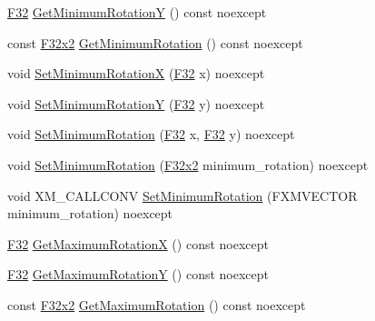\begin{DoxyCompactItemize}
\item 
\mbox{\hyperlink{namespacemage_aa97e833b45f06d60a0a9c4fc22ae02c0}{F32}} \mbox{\hyperlink{classmage_1_1script_1_1_mouse_look_script_a8faf82867207fb604f7155b8dbadfdb0}{Get\+Minimum\+RotationY}} () const noexcept
\item 
const \mbox{\hyperlink{namespacemage_aee4759dedc8def6c6dec26b5c7eddf29}{F32x2}} \mbox{\hyperlink{classmage_1_1script_1_1_mouse_look_script_a09e7e193cf2f5dca3342a130268a7a67}{Get\+Minimum\+Rotation}} () const noexcept
\item 
void \mbox{\hyperlink{classmage_1_1script_1_1_mouse_look_script_a07c261e34b3131114efacb0d0f6ae076}{Set\+Minimum\+RotationX}} (\mbox{\hyperlink{namespacemage_aa97e833b45f06d60a0a9c4fc22ae02c0}{F32}} x) noexcept
\item 
void \mbox{\hyperlink{classmage_1_1script_1_1_mouse_look_script_ab78678ccb7bdf6ac4093b7911bf81d54}{Set\+Minimum\+RotationY}} (\mbox{\hyperlink{namespacemage_aa97e833b45f06d60a0a9c4fc22ae02c0}{F32}} y) noexcept
\item 
void \mbox{\hyperlink{classmage_1_1script_1_1_mouse_look_script_a6964af9c1c264be02c37671019ab117f}{Set\+Minimum\+Rotation}} (\mbox{\hyperlink{namespacemage_aa97e833b45f06d60a0a9c4fc22ae02c0}{F32}} x, \mbox{\hyperlink{namespacemage_aa97e833b45f06d60a0a9c4fc22ae02c0}{F32}} y) noexcept
\item 
void \mbox{\hyperlink{classmage_1_1script_1_1_mouse_look_script_ab901aa0a3d22ef1e28f00db6f4f99aa1}{Set\+Minimum\+Rotation}} (\mbox{\hyperlink{namespacemage_aee4759dedc8def6c6dec26b5c7eddf29}{F32x2}} minimum\+\_\+rotation) noexcept
\item 
void X\+M\+\_\+\+C\+A\+L\+L\+C\+O\+NV \mbox{\hyperlink{classmage_1_1script_1_1_mouse_look_script_ab120a7b0d01acb64ae4287d716d89a09}{Set\+Minimum\+Rotation}} (F\+X\+M\+V\+E\+C\+T\+OR minimum\+\_\+rotation) noexcept
\item 
\mbox{\hyperlink{namespacemage_aa97e833b45f06d60a0a9c4fc22ae02c0}{F32}} \mbox{\hyperlink{classmage_1_1script_1_1_mouse_look_script_a5d0e63ee050bf07f5c8ad75ca9ced307}{Get\+Maximum\+RotationX}} () const noexcept
\item 
\mbox{\hyperlink{namespacemage_aa97e833b45f06d60a0a9c4fc22ae02c0}{F32}} \mbox{\hyperlink{classmage_1_1script_1_1_mouse_look_script_a24f48ac9e66f9c14645db71fd55ab9c6}{Get\+Maximum\+RotationY}} () const noexcept
\item 
const \mbox{\hyperlink{namespacemage_aee4759dedc8def6c6dec26b5c7eddf29}{F32x2}} \mbox{\hyperlink{classmage_1_1script_1_1_mouse_look_script_a2ceb928a903baf5b30ea99e321af671c}{Get\+Maximum\+Rotation}} () const noexcept

\end{DoxyCompactItemize}
